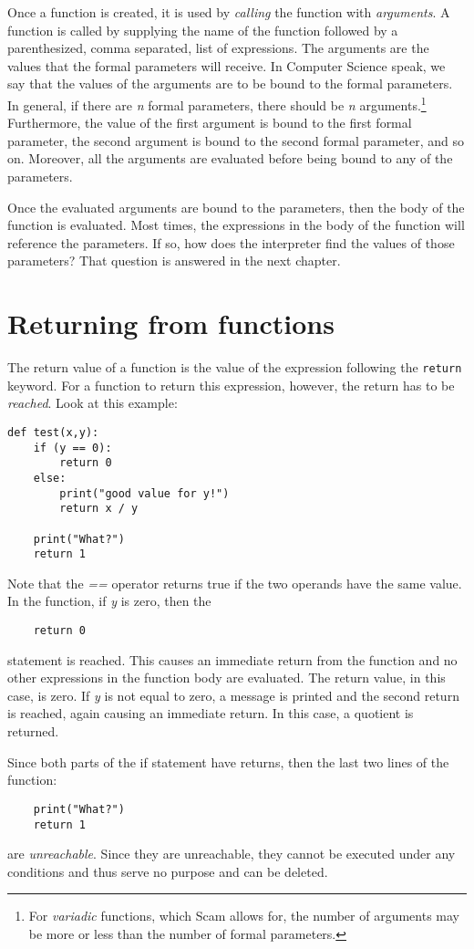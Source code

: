 Once a function is created,
it is used by {\it calling} the
function with {\it arguments}.
A function is called by supplying
the name of the function followed by a parenthesized,
comma separated, list of expressions.
The arguments are
the values that the formal parameters will receive.
In Computer Science speak, we say that the values
of the arguments are to be bound to
the
formal parameters.
In general, if there are {\it n} formal parameters,
there should be {\it n} arguments.\footnote{
For {\it variadic} functions, which Scam
allows for, the number of arguments
may be more or less than the number of formal parameters.
}
Furthermore, the value of the
first argument is bound to the first formal parameter, the
second argument is bound to the second formal parameter,
and so on. Moreover, all the arguments are evaluated
before being bound to any of the parameters.

Once the evaluated arguments are bound to the parameters,
then the body of the function is evaluated. Most times,
the expressions in the body of the function will reference
the parameters. If so, how does the interpreter find the
values of those parameters? That question is answered in
the next chapter.

\section{Returning from functions}

The return value of a function is the value of the expression
following the {\tt return} keyword.
For a function to return this  expression, however,
the return has to be {\it reached}.
Look at this example:

\begin{verbatim}
def test(x,y):
    if (y == 0):
        return 0
    else:
        print("good value for y!")
        return x / y

    print("What?")
    return 1
\end{verbatim}

Note that the {\it ==} operator returns true if the
two operands have the same value.
In the function, if {\it y} is zero, then the
\begin{verbatim}
    return 0
\end{verbatim}

statement is reached.
This causes an
immediate return from the function and
no other expressions in the function body are evaluated.
The return value, in this case, is zero.
If {\it y} is not equal to zero,
a message is printed and 
the second return is reached, again causing
an immediate return. In this case,
a quotient is returned.

Since both parts of the if statement have
returns, then the last two lines of the
function:

\begin{verbatim}
    print("What?")
    return 1
\end{verbatim}

are {\it unreachable}. Since they
are unreachable, they cannot be
executed under any conditions and
thus serve no purpose and can be deleted.
